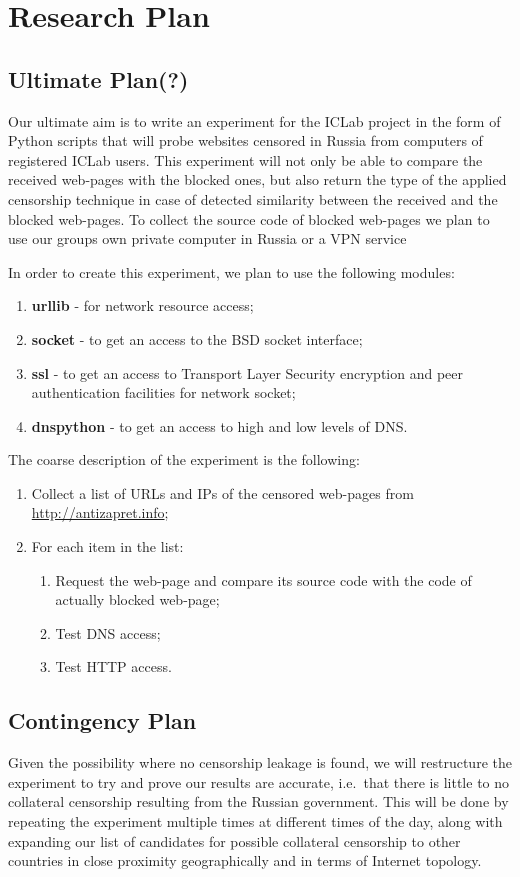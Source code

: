 \documentclass[conference]{IEEEtran}
\begin{document}
\section{Research Plan}
\subsection{Ultimate Plan(?)}
Our ultimate aim is to write an experiment for the ICLab project \cite{IClab} in the form of Python scripts that will probe websites censored in Russia from computers of registered ICLab users. 
This experiment will not only be able to compare the received web-pages with the blocked ones, but also return the type of the applied censorship technique in case of detected similarity between the received and the blocked web-pages. 
To collect the source code of blocked web-pages we plan to use our groups own private computer in Russia or a VPN service

In order to create this experiment, we plan to use the following modules:
\begin{enumerate}
\item \textbf{urllib} - for network resource access;
\item \textbf{socket} - to get an access to the BSD socket interface;
\item \textbf{ssl} - to get an access to Transport Layer Security encryption and peer authentication facilities for network socket;
\item \textbf{dnspython} - to get an access to high and low levels of DNS. 
\end{enumerate}

The coarse description of the experiment is the following:
\begin{enumerate}
\item Collect a list of URLs and IPs of the censored web-pages from \url{http://antizapret.info};
\item For each item in the list:
    \begin{enumerate}
    \item Request the web-page and compare its source code with the code of actually blocked web-page;
    \item Test DNS access;
    \item Test HTTP access.
    \end{enumerate}
\end{enumerate}

\subsection{Contingency Plan}
Given the possibility where no censorship leakage is found, we will restructure the experiment to try and prove our results are accurate, i.e.\  that there is little to no collateral censorship resulting from the Russian government. 
This will be done by repeating the experiment multiple times at different times of the day, along with expanding our list of candidates for possible collateral censorship to other countries in close proximity geographically and in terms of Internet topology. 
\end{document}
